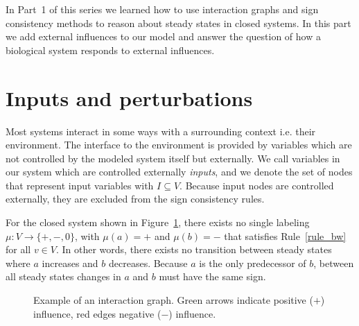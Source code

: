 In Part~1 of this series we learned how to use interaction graphs and sign consistency methods
 to reason about steady states in closed systems.
In this part we add external influences to our model and answer the question
 of how a biological system responds to external influences.


\section*{Inputs and perturbations}

Most systems interact in some ways with a surrounding context i.e. their environment.
The interface to the environment is provided by variables which are not controlled by the modeled system itself but externally.
We call variables in our system which are controlled externally \emph{inputs},
and we denote the set of nodes that represent input variables with $I \subseteq V$.
Because input nodes are controlled externally, they are excluded from the sign consistency rules.

For the closed system shown in Figure~\ref{fig:ig},
 there exists no single labeling $\mu: V \rightarrow \{\plus, \minus, 0\}$,
 with $\mu(a)=\plus$ and $\mu(b)=\minus$ that satisfies Rule~\ref{rule_bw} for all $v \in V$.
%
In other words, there exists no transition between steady states where $a$ increases and $b$ decreases.
Because $a$ is the only predecessor of $b$, between all steady states changes in $a$ and $b$ must have the same sign.

\begin{figure}
  \centering
  \caption{Example of an interaction graph. Green arrows indicate positive ($\plus$) influence,
    red edges negative ($\minus$) influence.
  } 
  \label{fig:ig}
\end{figure}

